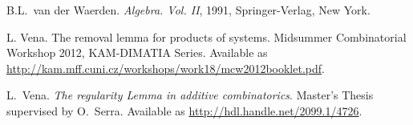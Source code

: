 \documentclass[10pt]{article}
\begin{document}
\begin{thebibliography}{99}
B.L.~van der Waerden. \emph{Algebra. {V}ol. {II}}, 1991, Springer-Verlag, New York.

L. Vena. The removal lemma for products of systems. Midsummer Combinatorial Workshop 2012, KAM-DIMATIA Series. Available as \url{http://kam.mff.cuni.cz/workshops/work18/mcw2012booklet.pdf}.

L.~Vena. \emph{The regularity Lemma in additive combinatorics}. Master's Thesis supervised by O.~Serra.
Available as \url{http://hdl.handle.net/2099.1/4726}.

\end{thebibliography}
\end{document}

